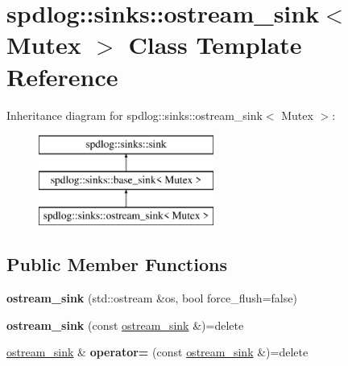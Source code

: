 \hypertarget{classspdlog_1_1sinks_1_1ostream__sink}{}\section{spdlog\+:\+:sinks\+:\+:ostream\+\_\+sink$<$ Mutex $>$ Class Template Reference}
\label{classspdlog_1_1sinks_1_1ostream__sink}
Inheritance diagram for spdlog\+:\+:sinks\+:\+:ostream\+\_\+sink$<$ Mutex $>$\+:\begin{figure}[H]
\begin{center}
\leavevmode
\includegraphics[height=3.000000cm]{classspdlog_1_1sinks_1_1ostream__sink}
\end{center}
\end{figure}
\subsection*{Public Member Functions}
\begin{DoxyCompactItemize}
\item 
{\bfseries ostream\+\_\+sink} (std\+::ostream \&os, bool force\+\_\+flush=false)\hypertarget{classspdlog_1_1sinks_1_1ostream__sink_aa038c6518dc69c08a1251e7469bc4fd8}{}\label{classspdlog_1_1sinks_1_1ostream__sink_aa038c6518dc69c08a1251e7469bc4fd8}

\item 
{\bfseries ostream\+\_\+sink} (const \hyperlink{classspdlog_1_1sinks_1_1ostream__sink}{ostream\+\_\+sink} \&)=delete\hypertarget{classspdlog_1_1sinks_1_1ostream__sink_a761f1c26210fe42673af4734b38fe167}{}\label{classspdlog_1_1sinks_1_1ostream__sink_a761f1c26210fe42673af4734b38fe167}

\item 
\hyperlink{classspdlog_1_1sinks_1_1ostream__sink}{ostream\+\_\+sink} \& {\bfseries operator=} (const \hyperlink{classspdlog_1_1sinks_1_1ostream__sink}{ostream\+\_\+sink} \&)=delete\hypertarget{classspdlog_1_1sinks_1_1ostream__sink_a727591b2a4ca044848cacccfca4eb3af}{}\label{classspdlog_1_1sinks_1_1ostream__sink_a727591b2a4ca044848cacccfca4eb3af}

\end{DoxyCompactItemize}
